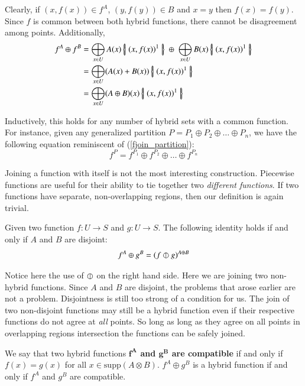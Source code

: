 Clearly, if $(x,f(x)) \in f^A$, $(y,f(y)) \in B$ and $x=y$ then $f(x)=f(y)$.
Since $f$ is common between both hybrid functions, there cannot be disagreement among points.
Additionally,
\begin{align}
	f^A \oplus f^B 
		&= \bigoplus_{x \in U} A(x) \hset{ (x, f(x) )^1 } 
			\; \oplus \; \bigoplus_{x \in U} B(x) \hset{ (x, f(x) )^1 } \notag \\
		&= \bigoplus_{x \in U} (A(x) + B(x)) \hset{ (x, f(x) )^1 } \notag \\
		&= \bigoplus_{x \in U} (A \oplus B)(x) \hset{ (x, f(x) )^1 }
\end{align}


Inductively, this holds for any number of hybrid sets with a common function.
For instance, given any generalized partition $P = P_1 \oplus P_2 \oplus \ldots \oplus P_n$, 
we have the following equation reminiscent of (\ref{fjoin_partition}):
\begin{equation}
 f^P = f^{P_1} \oplus f^{P_2} \oplus \ldots \oplus f^{P_n}
\end{equation}


Joining a function with itself is not the most interesting construction.
Piecewise functions are useful for their ability to tie together two \emph{different functions}.
If two functions have separate, non-overlapping regions, then our definition is again trivial.


\begin{theorem}
	Given two function $f : U \to S$ and $g : U \to S$. The following identity holds if and only if $A$ and $B$ are disjoint:
	\begin{equation}
		f^A \oplus g^B = (f \varobar g)^{A \oplus B}
	\end{equation}
\end{theorem}


Notice here the use of $\varobar$ on the right hand side.
Here we are joining two non-hybrid functions.
Since $A$ and $B$ are disjoint, the problems that arose earlier are not a problem.
Disjointness is still too strong of a condition for us.
The join of two non-disjoint functions may still be a hybrid function 
even if their respective functions do not agree at \emph{all} points.
So long as long as they agree on all points in overlapping regions intersection the functions can be safely joined.


\begin{definition}
	We say that two hybrid functions \textbf{$\boldsymbol{f^A}$ and $\boldsymbol{g^B}$ are compatible} 
	if and only if $f(x) = g(x)$ for all $x \in \text{supp} (A \otimes B)$.
	$f^A \oplus  g^B$ is a hybrid function if and only if $f^A$ and $g^B$ are compatible.
\end{definition}


